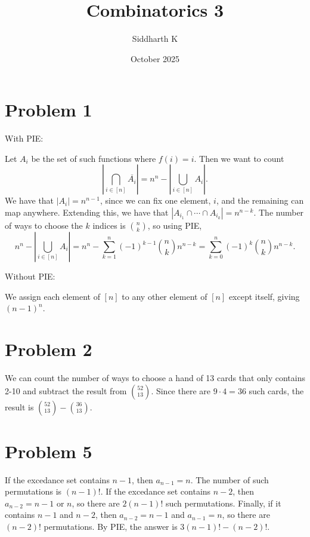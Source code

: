 \documentclass{article}
\title{Combinatorics 3}
\author{Siddharth K}
\date{October 2025}
\begin{document}
\maketitle

\section*{Problem 1}
With PIE:

Let $A_i$ be the set of such functions where $f(i) = i$. Then we want to count
$$\left|\bigcap_{i \in [n]} \overline{A_i}\right| = n^n - \left|\bigcup_{i\in [n]} A_i\right|.$$
We have that $|A_i| = n^{n - 1}$, since we can fix one element, $i$, and the remaining can map anywhere. Extending this, we have that $|A_{i_1} \cap \cdots \cap A_{i_k}| = n^{n - k}$. The number of ways to choose the $k$ indices is $\binom{n}{k}$, so using PIE,
$$n^n - \left|\bigcup_{i\in [n]} A_i\right| = n^n - \sum_{k = 1}^n (-1)^{k - 1}\binom nk n^{n - k} = \sum_{k = 0}^n (-1)^{k}\binom nk n^{n - k}.$$

Without PIE:

We assign each element of $[n]$ to any other element of $[n]$ except itself, giving $(n - 1)^n$.

\section*{Problem 2}
We can count the number of ways to choose a hand of 13 cards that only contains 2-10 and subtract the result from $\binom{52}{13}$. Since there are $9 \cdot 4 = 36$ such cards, the result is $\binom{52}{13} - \binom{36}{13}$.

\section*{Problem 5}
If the excedance set contains $n - 1$, then $a_{n - 1} = n$. The number of such permutations is $(n - 1)!$. If the excedance set contains $n - 2$, then $a_{n - 2} = n - 1$ or $n$, so there are $2(n - 1)!$ such permutations. Finally, if it contains $n - 1$ and $n - 2$, then $a_{n - 2} = n - 1$ and $a_{n - 1} = n$, so there are $(n - 2)!$ permutations. By PIE, the answer is $3(n - 1)! - (n - 2)!$.
\end{document}
